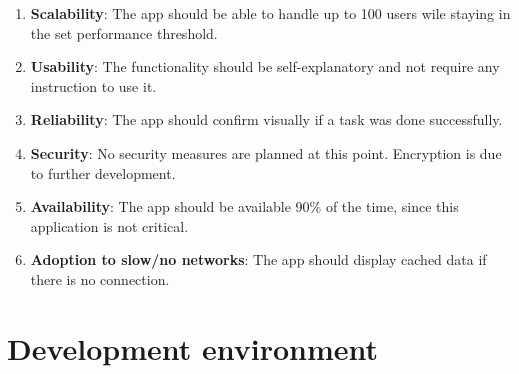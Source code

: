 \documentclass[conference]{IEEEtran}
\numberwithin{figure}{subsection}
\begin{document}
\begin{enumerate}
 \item \textbf{Scalability}: The app should be able to handle up to 100 users wile staying in the set performance threshold.\\

 \item \textbf{Usability}: The functionality should be self-explanatory and not require any instruction to use it.\\

 \item \textbf{Reliability}: The app should confirm visually if a task was done successfully.\\

 \item \textbf{Security}: No security measures are planned at this point. Encryption is due to further development.\\

 \item \textbf{Availability}: The app should be available 90\% of the time, since this application is not critical.\\

 \item \textbf{Adoption to slow/no networks}: The app should display cached data if there is no connection.\\
 \end{enumerate}


\section{Development environment}
\end{document}

